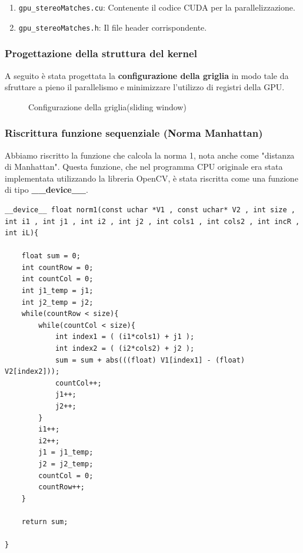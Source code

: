 \documentclass[12pt,a4paper]{report}
\begin{document}
\begin{enumerate}
    \item \texttt{gpu\_stereoMatches.cu}: Contenente il codice CUDA per la parallelizzazione.
    \item \texttt{gpu\_stereoMatches.h}: Il file header corrispondente.
\end{enumerate}

\vspace{1cm}

\subsubsection{Progettazione della struttura del kernel}

A seguito è stata progettata la \textbf{configurazione della griglia} in modo tale da sfruttare
a pieno il parallelismo e minimizzare l'utilizzo di registri della GPU.

\begin{figure}[h]
    \centering
    \caption{Configurazione della griglia(sliding window) }
\end{figure}

\newpage
\subsubsection{Riscrittura funzione sequenziale (Norma Manhattan)}

Abbiamo riscritto la funzione che calcola la norma 1, nota anche come "distanza di Manhattan". Questa funzione, che nel programma CPU originale era stata implementata utilizzando la libreria OpenCV, è stata riscritta come una funzione di tipo \textbf{\_\_device\_\_}.

\begin{lstlisting}
__device__ float norm1(const uchar *V1 , const uchar* V2 , int size , int i1 , int j1 , int i2 , int j2 , int cols1 , int cols2 , int incR , int iL){

    float sum = 0;
    int countRow = 0;
    int countCol = 0;
    int j1_temp = j1;
    int j2_temp = j2;
    while(countRow < size){
        while(countCol < size){
            int index1 = ( (i1*cols1) + j1 );
            int index2 = ( (i2*cols2) + j2 );
            sum = sum + abs(((float) V1[index1] - (float) V2[index2]));
            countCol++;
            j1++;
            j2++;
        }
        i1++;
        i2++;
        j1 = j1_temp;
        j2 = j2_temp;
        countCol = 0;
        countRow++;
    }

    return sum;
    
}
\end{lstlisting}
\end{document}
